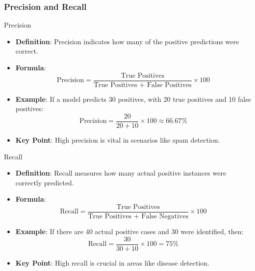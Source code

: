 \documentclass[aspectratio=169]{beamer}
\begin{document}
\begin{frame}[fragile]
    \frametitle{Precision and Recall}
    \begin{block}{Precision}
        \begin{itemize}
            \item \textbf{Definition}:
            Precision indicates how many of the positive predictions were correct.
            \item \textbf{Formula}:
            \begin{equation}
            \text{Precision} = \frac{\text{True Positives}}{\text{True Positives + False Positives}} \times 100
            \end{equation}
            \item \textbf{Example}:
            If a model predicts 30 positives, with 20 true positives and 10 false positives:
            \[
            \text{Precision} = \frac{20}{20 + 10} \times 100 \approx 66.67\%
            \]
            \item \textbf{Key Point}:
            High precision is vital in scenarios like spam detection.
        \end{itemize}
    \end{block}

    \begin{block}{Recall}
        \begin{itemize}
            \item \textbf{Definition}:
            Recall measures how many actual positive instances were correctly predicted.
            \item \textbf{Formula}:
            \begin{equation}
            \text{Recall} = \frac{\text{True Positives}}{\text{True Positives + False Negatives}} \times 100
            \end{equation}
            \item \textbf{Example}:
            If there are 40 actual positive cases and 30 were identified, then:
            \[
            \text{Recall} = \frac{30}{30 + 10} \times 100 = 75\%
            \]
            \item \textbf{Key Point}:
            High recall is crucial in areas like disease detection.
        \end{itemize}
    \end{block}
\end{frame}
\end{document}
